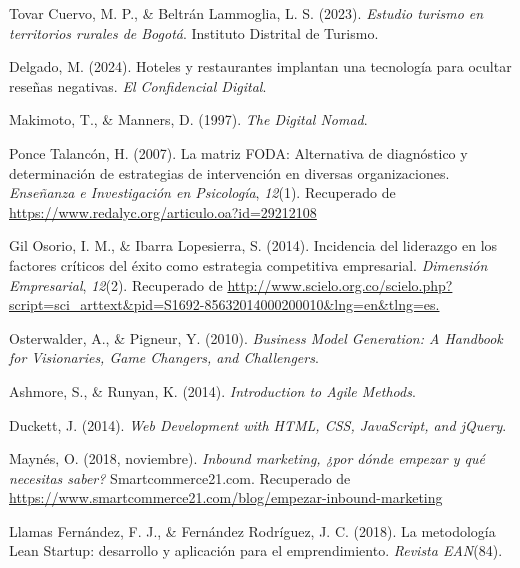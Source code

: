 \begin{thebibliography}{99}

    Tovar Cuervo, M. P., \& Beltrán Lammoglia, L. S. (2023).
    \textit{Estudio turismo en territorios rurales de Bogotá}.
    Instituto Distrital de Turismo.

    Delgado, M. (2024).
    Hoteles y restaurantes implantan una tecnología para ocultar reseñas negativas.
    \textit{El Confidencial Digital}.

    Makimoto, T., \& Manners, D. (1997).
    \textit{The Digital Nomad}.

    Ponce Talancón, H. (2007).
    La matriz FODA: Alternativa de diagnóstico y determinación de estrategias de intervención en diversas organizaciones.
    \textit{Enseñanza e Investigación en Psicología}, \textit{12}(1).
    Recuperado de \url{https://www.redalyc.org/articulo.oa?id=29212108}

    Gil Osorio, I. M., \& Ibarra Lopesierra, S. (2014).
    Incidencia del liderazgo en los factores críticos del éxito como estrategia competitiva empresarial.
    \textit{Dimensión Empresarial}, \textit{12}(2).
    Recuperado de \url{http://www.scielo.org.co/scielo.php?script=sci_arttext&pid=S1692-85632014000200010&lng=en&tlng=es.}

    Osterwalder, A., \& Pigneur, Y. (2010).
    \textit{Business Model Generation: A Handbook for Visionaries, Game Changers, and Challengers}.

    Ashmore, S., \& Runyan, K. (2014).
    \textit{Introduction to Agile Methods}.

    Duckett, J. (2014).
    \textit{Web Development with HTML, CSS, JavaScript, and jQuery}.

    Maynés, O. (2018, noviembre).
    \textit{Inbound marketing, ¿por dónde empezar y qué necesitas saber?}
    Smartcommerce21.com.
    Recuperado de \url{https://www.smartcommerce21.com/blog/empezar-inbound-marketing}

    Llamas Fernández, F. J., \& Fernández Rodríguez, J. C. (2018).
    La metodología Lean Startup: desarrollo y aplicación para el emprendimiento.
    \textit{Revista EAN}(84).

\end{thebibliography}
